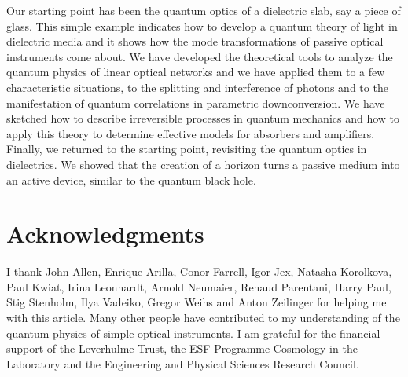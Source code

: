 \documentclass[12pt,amsmath,amssymb]{article}
\numberwithin{equation}{section}
\begin{document}
Our starting point has been the quantum optics of a dielectric slab,
say a piece of glass. This simple example indicates
how to develop a quantum theory of light in dielectric media
and it shows how the mode transformations of passive
optical instruments come about.
We have developed the theoretical tools to analyze the quantum physics
of linear optical networks and we have applied them to a few
characteristic situations, to the splitting and interference of photons
and to the manifestation of quantum correlations in
parametric downconversion.
We have sketched how to describe irreversible processes
in quantum mechanics and how to apply this theory to determine
effective models for absorbers and amplifiers.
Finally, we returned to the starting point, revisiting the quantum
optics in dielectrics. We showed that the creation of a horizon
turns a passive medium into an active device, similar to
the quantum black hole.

\section*{Acknowledgments}

I thank
John Allen,
Enrique Arilla,
Conor Farrell,
Igor Jex,
Natasha Korolkova,
Paul Kwiat,
Irina Leonhardt,
Arnold Neumaier,
Renaud Parentani,
Harry Paul,
Stig Stenholm,
Ilya Vadeiko,
Gregor Weihs
and
Anton Zeilinger
for helping me with this article.
Many other people have contributed to my
understanding of the quantum physics of simple
optical instruments.
I am grateful for the financial support of the
Leverhulme Trust,
the ESF Programme Cosmology in the Laboratory
and the
Engineering and Physical Sciences Research Council.

\end{document}
